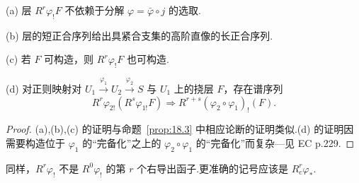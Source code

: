 \begin{proposition}\label{prop:18.4}
(a) 层 $R^{r}\varphi_{!}F$ 不依赖于分解 $\varphi = \bar{\varphi} \circ j$ 的选取.

(b) 层的短正合序列给出具紧合支集的高阶直像的长正合序列.

(c) 若 $F$ 可构造，则 $R^{r}\varphi_{!}F$ 也可构造.

(d) 对正则映射对 $U_1 \xrightarrow{\varphi_1} U_2 \xrightarrow{\varphi_2} S$ 与 $U_1$ 上的挠层 $F$，存在谱序列
\[
R^{r}\varphi_{2!}(R^{s}\varphi_{1!}F) \Rightarrow R^{r+s}(\varphi_2 \circ \varphi_1)_{!}(F).
\]
\end{proposition}

\begin{proof}
(a),(b),(c) 的证明与命题~\ref{prop:18.3} 中相应论断的证明类似.(d) 的证明因需要构造位于 $\varphi_1$ 的``完备化''之上的 $\varphi_2 \circ \varphi_1$ 的``完备化''而复杂---见 EC p.229.
\end{proof}

同样，$R^{r}\varphi_{!}$ 不是 $R^{0}\varphi_{!}$ 的第 $r$ 个右导出函子.更准确的记号应该是 $R^{r}_{c}\varphi_{*}$.
